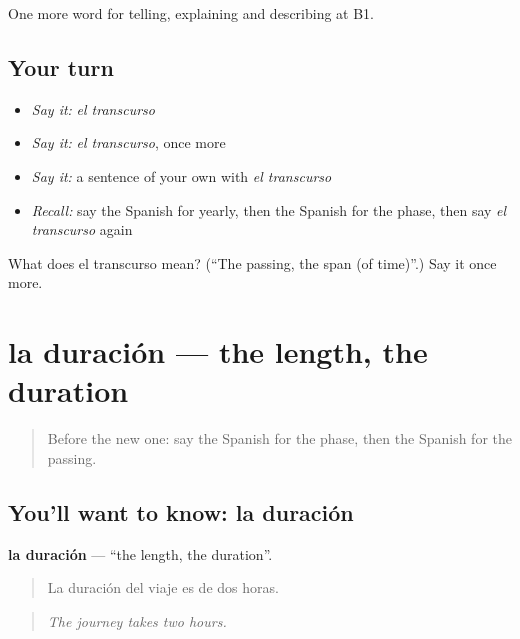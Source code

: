\begin{grammarlens}[title={What you've built}]
One more word for telling, explaining and describing at B1.
\end{grammarlens}

\subsection*{Your turn}
\begin{itemize}
\raggedright
  \item \emph{Say it:} \emph{el transcurso}
  \item \emph{Say it:} \emph{el transcurso}, once more
  \item \emph{Say it:} a sentence of your own with \emph{el transcurso}
  \item \emph{Recall:} say the Spanish for yearly, then the Spanish for the phase, then say \emph{el transcurso} again
\end{itemize}

\begin{tcolorbox}[breakable,colback=teal!4,colframe=teal!35!black,title={Before you move on}]
What does el transcurso mean? (\textquotedblleft{}The passing, the span (of time)\textquotedblright{}.) Say it once more.
\end{tcolorbox}
\section[la duración]{la duración — the length, the duration}

\label{lesson:ES-C541-duracion}



\begin{quote}
Before the new one: say the Spanish for the phase, then the Spanish for the passing.
\end{quote}

\subsection*{You'll want to know: la duración}
\textbf{la duración} — \textquotedblleft{}the length, the duration\textquotedblright{}.

\begin{quote}
La duración del viaje es de dos horas.
\end{quote}

\begin{quote}
\emph{The journey takes two hours.}
\end{quote}

